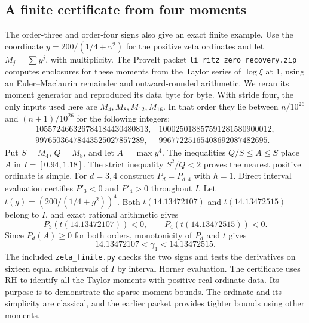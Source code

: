 \documentclass[11pt]{article}
\begin{document}
\subsection*{A finite certificate from four moments}
The order-three and order-four signs also give an exact finite example.
Use the coordinate $y=200/(1/4+\gamma^2)$ for the positive zeta ordinates
and let $M_j=\sum y^j$, with multiplicity. The ProveIt packet
\texttt{li\_ritz\_zero\_recovery.zip} computes enclosures for these moments
from the Taylor series of $\log\xi$ at $1$, using an Euler--Maclaurin
remainder and outward-rounded arithmetic. We reran its moment generator
and reproduced its data byte for byte. With stride four, the only inputs
used here are $M_4,M_8,M_{12},M_{16}$. In that order they lie between
$n/10^{26}$ and $(n+1)/10^{26}$ for the following integers:
\[
\begin{array}{rr}
105572466326784184430480813,&100025018857591281580900012,\\
99765036478443525027857289,&99677225165408692087482695.
\end{array}
\]
Put $S=M_4$, $Q=M_8$, and let $A=\max y^4$. The inequalities
$Q/S\le A\le S$ place $A$ in $I=[0.94,1.18]$.
The strict inequality $S^2/Q<2$ proves the nearest positive ordinate
is simple. For $d=3,4$ construct $P_d=P_{d,4}$ with $h=1$.
Direct interval evaluation certifies $P'_3<0$ and $P'_4>0$ throughout
$I$. Let $t(g)=(200/(1/4+g^2))^4$.
Both $t(14.13472107)$ and $t(14.13472515)$ belong to $I$, and exact
rational arithmetic gives
\[
   P_3(t(14.13472107))<0,\qquad P_4(t(14.13472515))<0.
\]
Since $P_d(A)\ge0$ for both orders, monotonicity of $P_d$ and $t$ gives
\[
             \boxed{14.13472107<\gamma_1<14.13472515.}
\]
The included \texttt{zeta\_finite.py} checks the two signs and tests the
derivatives on sixteen equal subintervals of $I$ by interval Horner
evaluation. The certificate uses RH to identify all the Taylor moments
with positive real ordinate data. Its purpose is to demonstrate the
sparse-moment bounds. The ordinate and its simplicity are classical,
and the earlier packet provides tighter bounds using other moments.
\end{document}
